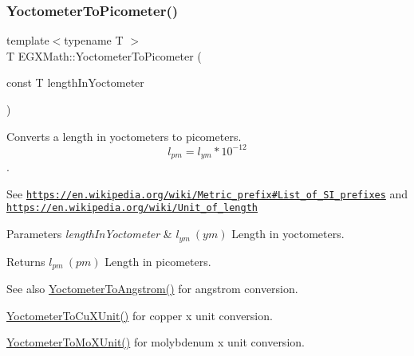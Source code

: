 \subsubsection{\texorpdfstring{Yoctometer\+To\+Picometer()}{YoctometerToPicometer()}}
{\footnotesize\ttfamily template$<$typename T $>$ \\
T E\+G\+X\+Math\+::\+Yoctometer\+To\+Picometer (\begin{DoxyParamCaption}\item[{const T}]{length\+In\+Yoctometer }\end{DoxyParamCaption})}



Converts a length in yoctometers to picometers. \[ l_{pm}=l_{ym} * 10^{-12} \]. 

See \href{https://en.wikipedia.org/wiki/Metric_prefix#List_of_SI_prefixes}{\tt https\+://en.\+wikipedia.\+org/wiki/\+Metric\+\_\+prefix\#\+List\+\_\+of\+\_\+\+S\+I\+\_\+prefixes} and \href{https://en.wikipedia.org/wiki/Unit_of_length}{\tt https\+://en.\+wikipedia.\+org/wiki/\+Unit\+\_\+of\+\_\+length} 
\begin{DoxyParams}{Parameters}
{\em length\+In\+Yoctometer} & $ l_{ym}\ (ym)$ Length in yoctometers. \\
\hline
\end{DoxyParams}
\begin{DoxyReturn}{Returns}
$ l_{pm}\ (pm)$ Length in picometers. 
\end{DoxyReturn}
\begin{DoxySeeAlso}{See also}
\mbox{\hyperlink{group___e_g_x_math-_conversions-_length_conversions-_s_i-_yoctometer-_non-_s_i_ga1189896c419175e90e23cea9d8f6b52a}{Yoctometer\+To\+Angstrom()}} for angstrom conversion. 

\mbox{\hyperlink{group___e_g_x_math-_conversions-_length_conversions-_s_i-_yoctometer-_non-_s_i_ga0266faf325ea86fef13391fb6e792ff8}{Yoctometer\+To\+Cu\+X\+Unit()}} for copper x unit conversion. 

\mbox{\hyperlink{group___e_g_x_math-_conversions-_length_conversions-_s_i-_yoctometer-_non-_s_i_ga6a6a1fb3ecc97e377fc728c03327048e}{Yoctometer\+To\+Mo\+X\+Unit()}} for molybdenum x unit conversion. 
\end{DoxySeeAlso}
\mbox{\label{group___e_g_x_math-_conversions-_length_conversions-_s_i-_yoctometer-_s_i_gae5313d3fbe14e0cbb4b58d4d432857e1}} 
